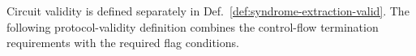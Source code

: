 \documentclass[acmsmall,screen,review,anonymous,nonacm]{acmart}
\begin{document}








Circuit validity is defined separately in
Def.~\ref{def:syndrome-extraction-valid}. The following protocol-validity
definition combines the control-flow termination requirements with the
required flag conditions.
\end{document}
